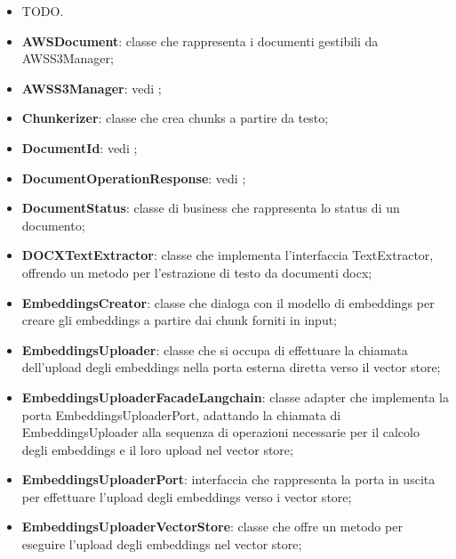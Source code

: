 \documentclass[10pt, a4paper]{article}
\begin{document}
\begin{itemize}
    \item TODO.
\end{itemize}

\begin{itemize}
    \item \label{AWSDocument}\textbf{AWSDocument}: classe che rappresenta i documenti gestibili da AWSS3Manager;
    \item \textbf{AWSS3Manager}: vedi ;
    \item \label{Chunkerizer}\textbf{Chunkerizer}: classe che crea chunks a partire da testo;
    \item \textbf{DocumentId}: vedi ;
    \item \textbf{DocumentOperationResponse}: vedi ;
    \item \label{DocumentStatus} \textbf{DocumentStatus}: classe di business che rappresenta lo status di un documento;
    \item \label{DOCXTextExtractor}\textbf{DOCXTextExtractor}: classe che implementa l'interfaccia TextExtractor, offrendo un metodo per l'estrazione di testo da documenti docx;
    \item  \label{EmbeddingsCreator}\textbf{EmbeddingsCreator}: classe che dialoga con il modello di embeddings per creare gli embeddings a partire dai chunk forniti in input;
    \item \label{EmbeddingsUploader}\textbf{EmbeddingsUploader}: classe che si occupa di effettuare la chiamata dell'upload degli embeddings nella porta esterna diretta verso il vector store;
    \item \label{EmbeddingsUploaderFacadeLangchain}\textbf{EmbeddingsUploaderFacadeLangchain}: classe adapter che implementa la porta EmbeddingsUploaderPort, adattando la chiamata di EmbeddingsUploader alla sequenza di operazioni necessarie per il calcolo degli embeddings e il loro upload nel vector store;
    \item \label{EmbeddingsUploaderPort}\textbf{EmbeddingsUploaderPort}: interfaccia che rappresenta la porta in uscita per effettuare l'upload degli embeddings verso i vector store;
    \item \label{EmbeddingsUploaderVectorStore}\textbf{EmbeddingsUploaderVectorStore}: classe che offre un metodo per eseguire l'upload degli embeddings nel vector store;

\end{itemize}
\end{document}
